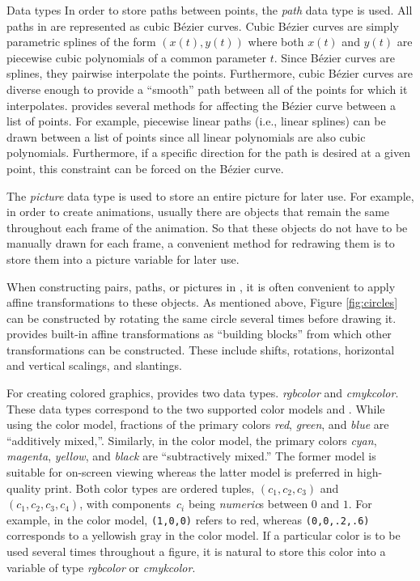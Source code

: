\begin{section}{Data types}
In order to store paths between points, the \textit{path} data type is
used.  All paths in \MP{} are represented as cubic B\'{e}zier curves.
Cubic B\'{e}zier curves are simply parametric splines of the form
$(x(t),y(t))$ where both $x(t)$ and $y(t)$ are piecewise cubic
polynomials of a common parameter $t$.  Since B\'{e}zier curves are
splines, they pairwise interpolate the points.  Furthermore, cubic
B\'{e}zier curves are diverse enough to provide a ``smooth'' path
between all of the points for which it interpolates.  \MP{} provides
several methods for affecting the B\'{e}zier curve between a list of
points.  For example, piecewise linear paths (i.e., linear splines) can
be drawn between a list of points since all linear polynomials are also
cubic polynomials.  Furthermore, if a specific direction for the path is
desired at a given point, this constraint can be forced on the
B\'{e}zier curve.

The \textit{picture} data type is used to store an entire picture for
later use.  For example, in order to create animations, usually there
are objects that remain the same throughout each frame of the animation.
So that these objects do not have to be manually drawn for each frame, a
convenient method for redrawing them is to store them into a picture
variable for later use.

When constructing pairs, paths, or pictures in \MP{}, it is often
convenient to apply affine transformations to these objects.  As
mentioned above, Figure \ref{fig:circles} can be constructed by rotating
the same circle several times before drawing it.  \MP{} provides
built-in affine transformations as ``building blocks'' from which other
transformations can be constructed.  These include shifts, rotations,
horizontal and vertical scalings, and slantings.

For creating colored graphics, \MP{} provides two data types.
\textit{rgbcolor} and \textit{cmykcolor}.  These data types correspond to the two
supported color models \RGB{} and \CMYK.  While using the \RGB{} color model,
fractions of the primary colors \textit{red}, \textit{green}, and
\textit{blue} are ``additively mixed,''.  Similarly, in the \CMYK{} color model, the primary
colors \textit{cyan}, \textit{magenta}, \textit{yellow}, and
\textit{black} are ``subtractively mixed.''  The former model is
suitable for on-screen viewing whereas the latter model is preferred in
high-quality print.  Both color types are ordered tuples,
$(c_1,c_2,c_3)$ and $(c_1,c_2,c_3,c_4)$, with components~$c_i$ being
\textit{numeric}s between $0$ and $1$.  For example, in the \RGB{} color
model, \texttt{(1,0,0)} refers to red, whereas \texttt{(0,0,.2,.6)}
corresponds to a yellowish gray in the \CMYK{} color model.  If a
particular color is to be used several times throughout a figure, it is
natural to store this color into a variable of type \textit{rgbcolor} or
\textit{cmykcolor}.


\end{section}
